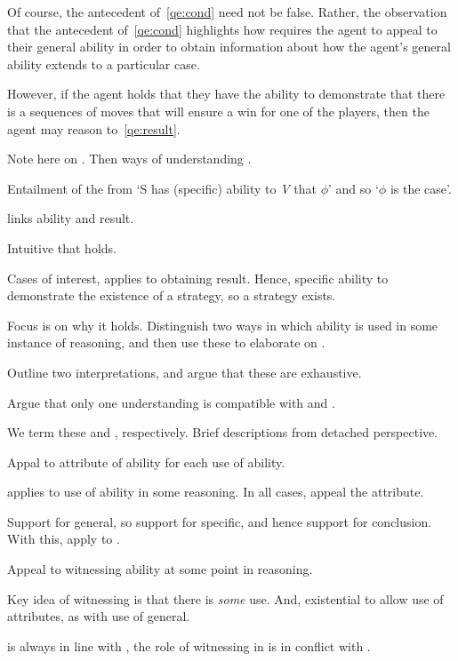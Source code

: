 \begin{note}
  Of course, the antecedent of~\ref{qe:cond} need not be false.
  Rather, the observation that the antecedent of~\ref{qe:cond} highlights how \GSI{} requires the agent to appeal to their general ability in order to obtain information about how the agent's general ability extends to a particular case.

  However, if the agent holds that they have the ability to demonstrate that there is a sequences of moves that will ensure a win for one of the players, then the agent may reason to~\ref{qe:result}.
\end{note}

\begin{note}[\aben{}]
  Note here on \aben{}.
  Then  ways of understanding \aben{}.

  \begin{proposition}
    Entailment of the from `S has (specific) ability to \emph{V} that \(\phi\)' and so `\(\phi\) is the case'.
  \end{proposition}

  \aben{} links ability and result.

  Intuitive that \aben{} holds.

  Cases of interest, \aben{} applies to obtaining result.
  Hence, specific ability to demonstrate the existence of a strategy, so a strategy exists.

  Focus is on why it holds.
  Distinguish two ways in which ability is used in some instance of reasoning, and then use these to elaborate on \aben{}.

  Outline two interpretations, and argue that these are exhaustive.

  Argue that only one understanding is compatible with \GSI{} and \aben{}.
\end{note}

\begin{note}[\WR{} and \AR{}]
  We term these \AR{} and \WR{}, respectively.
  Brief descriptions from detached perspective.

  \begin{proposition}[\AR{}]\label{A:s}
    Appal to attribute of ability for each use of ability.
  \end{proposition}

  \AR{} applies to use of ability in some reasoning.
  In all cases, appeal the attribute.

  Support for general, so support for specific, and hence support for conclusion.
  With this, apply to \aben{}.

  \begin{proposition}[\WR{}]
    Appeal to witnessing ability at some point in reasoning.
  \end{proposition}

  Key idea of witnessing is that there is \emph{some} use.
  And, existential to allow use of attributes, as with use of general.

  \AR{} is always in line with \uRa{}, the role of witnessing in \WR{} is in conflict with \uRa{}.
\end{note}

